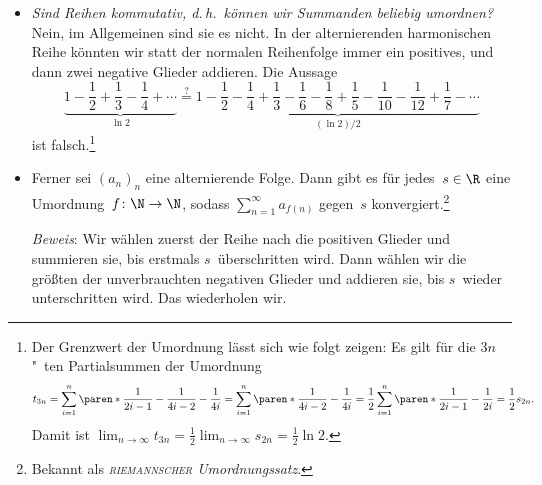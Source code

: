 \documentclass[a4paper]{article}
\begin{document}
\begin{itemize}
    \item \emph{Sind Reihen kommutativ, d.\,h.\ können wir Summanden beliebig umordnen?} Nein, im Allgemeinen sind sie es nicht. In der alternierenden harmonischen Reihe könnten wir statt der normalen Reihenfolge immer ein positives, und dann zwei negative Glieder addieren. Die Aussage
          \begin{equation*}
              \underbrace{1 - \frac{1}{2} + \frac{1}{3} - \frac{1}{4} + \cdots}_{\ln2} \overset{?}{=} \underbrace{1 - \frac{1}{2} - \frac{1}{4} + \frac{1}{3} - \frac{1}{6} - \frac{1}{8} + \frac{1}{5} - \frac{1}{10} - \frac{1}{12} + \frac{1}{7} - \cdots}_{(\ln2)/2}
          \end{equation*}
          ist falsch.\footnote{Der Grenzwert der Umordnung lässt sich wie folgt zeigen: Es gilt für die $3n$"~ten Partialsummen der Umordnung
              \begin{equation*}
                  t_{3n} = \sum_{i=1}^n \paren*{\frac{1}{2i-1} - \frac{1}{4i-2} - \frac{1}{4i}} = \sum_{i=1}^n \paren*{\frac{1}{4i-2} - \frac{1}{4i}} = \frac{1}{2} \sum_{i=1}^n \paren*{\frac{1}{2i-1} - \frac{1}{2i}} = \frac{1}{2} s_{2n}.
              \end{equation*}
              Damit ist $\lim_{n\to\infty} t_{3n} = \frac{1}{2} \lim_{n\to\infty} s_{2n} = \frac{1}{2} \ln 2$.}

    \item Ferner sei $(a_n)_n$ eine alternierende Folge. Dann gibt es für jedes~$s \in \R$ eine Umordnung~$f\colon \N\to\N$, sodass $\sum_{n=1}^\infty a_{f(n)}$ gegen~$s$ konvergiert.\footnote{Bekannt als \emph{\textsc{riemannscher} Umordnungssatz}.}

          \emph{Beweis}: Wir wählen zuerst der Reihe nach die positiven Glieder und summieren sie, bis erstmals $s$~überschritten wird. Dann wählen wir die größten der unverbrauchten negativen Glieder und addieren sie, bis $s$~wieder unterschritten wird. Das wiederholen wir.


\end{itemize}
\end{document}
